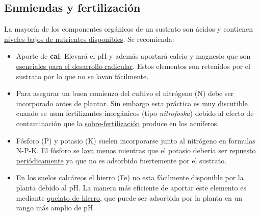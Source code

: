 \documentclass[a4paper,12pt,oneside]{article}
\begin{document}
\subsection{Enmiendas y fertilización}
\label{sec:org2be45e2}
La mayoría de los componentes orgánicos de un sustrato son ácidos y contienen
\uline{niveles bajos de nutrientes disponibles}. Se recomienda:
\begin{itemize}
\item Aporte de \textbf{cal}: Elevará el pH y además aportará calcio y magnesio que son
\uline{esenciales para el desarrollo radicular}. Estos elementos son retenidos por el
sustrato por lo que no se lavan fácilmente.
\item Para asegurar un buen comienzo del cultivo el nitrógeno (N) debe ser incorporado
antes de plantar. Sin embargo esta práctica es \uline{muy discutible} cuando se usan
fertilizantes inorgánicos (tipo \emph{nitrofoska}) debido al efecto de
contaminación que la \uline{sobre-fertilización} produce en los acuíferos.
\item Fósforo (P) y potasio (K) suelen incorporarse junto al nitrógeno en formulas
N-P-K. El fósforo se \uline{lava menos} mientras que el potasio debería ser
\uline{repuesto periódicamente} ya que no es adsorbido fuertemente por el sustrato.
\item En los suelos calcáreos el hierro (Fe) no esta fácilmente disponible por la
planta debido al pH. La manera más eficiente de aportar este elemento es
mediante \uline{quelato de hierro}, que puede ser adsorbida por la planta en un
rango más amplio de pH.
\end{itemize}
\end{document}
